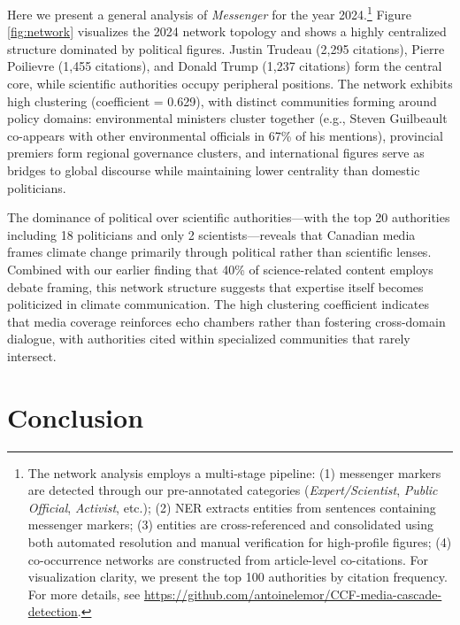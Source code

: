 \documentclass[12pt]{article}
\begin{document}
Here we present a general analysis of \emph{Messenger} for the year 2024.\footnote{The network analysis employs a multi-stage pipeline: (1) messenger markers are detected through our pre-annotated categories (\emph{Expert/Scientist}, \emph{Public Official}, \emph{Activist}, etc.); (2) NER extracts entities from sentences containing messenger markers; (3) entities are cross-referenced and consolidated using both automated resolution and manual verification for high-profile figures; (4) co-occurrence networks are constructed from article-level co-citations. For visualization clarity, we present the top 100 authorities by citation frequency. For more details, see \url{https://github.com/antoinelemor/CCF-media-cascade-detection}.} Figure \ref{fig:network} visualizes the 2024 network topology and shows a highly centralized structure dominated by political figures. Justin Trudeau (2,295 citations), Pierre Poilievre (1,455 citations), and Donald Trump (1,237 citations) form the central core, while scientific authorities occupy peripheral positions. The network exhibits high clustering (coefficient = 0.629), with distinct communities forming around policy domains: environmental ministers cluster together (e.g., Steven Guilbeault co-appears with other environmental officials in 67\% of his mentions), provincial premiers form regional governance clusters, and international figures serve as bridges to global discourse while maintaining lower centrality than domestic politicians.

The dominance of political over scientific authorities—with the top 20 authorities including 18 politicians and only 2 scientists—reveals that Canadian media frames climate change primarily through political rather than scientific lenses. Combined with our earlier finding that 40\% of science-related content employs debate framing, this network structure suggests that expertise itself becomes politicized in climate communication. The high clustering coefficient indicates that media coverage reinforces echo chambers rather than fostering cross-domain dialogue, with authorities cited within specialized communities that rarely intersect. 

\newpage
\section{Conclusion}
\end{document}
